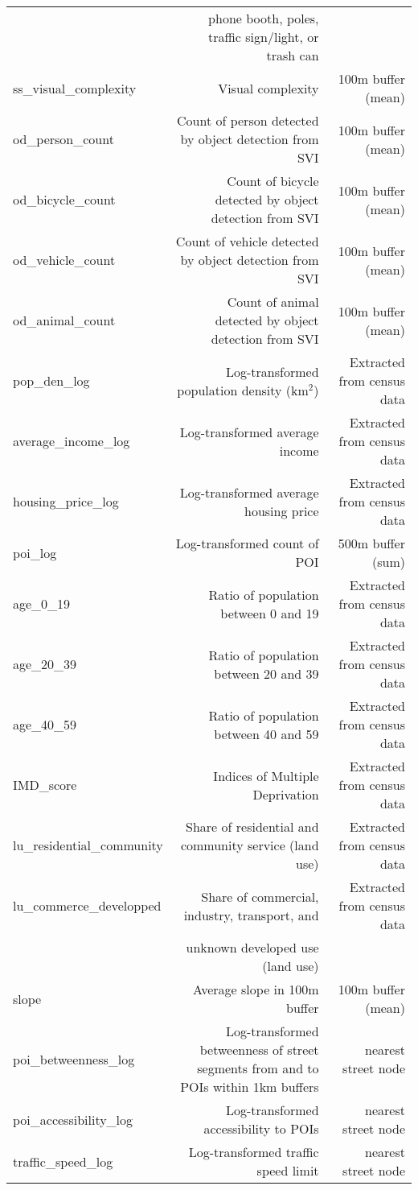 \documentclass[preprint,12pt, authoryear]{elsarticle}
\begin{document}
\begin{table}[!ht]
\begin{tabular}{lrr}
 & phone booth, poles, traffic sign/light, or trash can & \\
ss\_visual\_complexity & Visual complexity & 100m buffer (mean) \\
od\_person\_count & Count of person detected by object detection from SVI & 100m buffer (mean) \\
od\_bicycle\_count & Count of bicycle detected by object detection from SVI & 100m buffer (mean) \\
od\_vehicle\_count & Count of vehicle detected by object detection from SVI & 100m buffer (mean) \\
od\_animal\_count & Count of animal detected by object detection from SVI & 100m buffer (mean) \\
pop\_den\_log & Log-transformed population density (km$^2$) & Extracted from census data \\
average\_income\_log & Log-transformed average income & Extracted from census data \\
housing\_price\_log & Log-transformed average housing price & Extracted from census data \\
poi\_log & Log-transformed count of POI & 500m buffer (sum) \\
age\_0\_19 & Ratio of population between 0 and 19 & Extracted from census data \\
age\_20\_39 & Ratio of population between 20 and 39 & Extracted from census data \\
age\_40\_59 & Ratio of population between 40 and 59 & Extracted from census data \\
IMD\_score & Indices of Multiple Deprivation & Extracted from census data \\
lu\_residential\_community & Share of residential and community service (land use) & Extracted from census data \\
lu\_commerce\_developped & Share of commercial, industry, transport, and & Extracted from census data \\
 & unknown developed use (land use) & \\
slope & Average slope in 100m buffer & 100m buffer (mean) \\
poi\_betweenness\_log & Log-transformed betweenness of street segments from and to POIs within 1km buffers & nearest street node \\
poi\_accessibility\_log & Log-transformed accessibility to POIs & nearest street node \\
traffic\_speed\_log & Log-transformed traffic speed limit & nearest street node \\

\bottomrule
\end{tabular}
\end{table}
\end{document}

